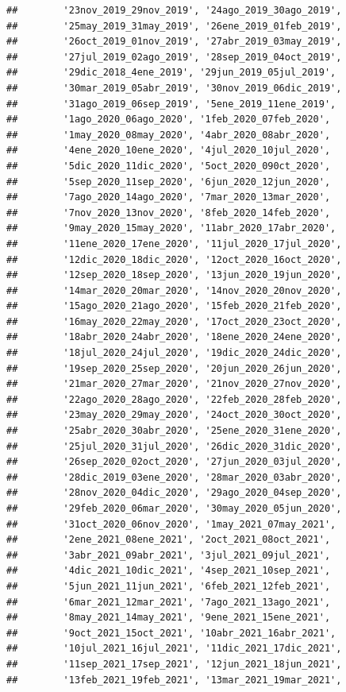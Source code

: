 \documentclass[
]{book}
\begin{document}
\begin{verbatim}
##        '23nov_2019_29nov_2019', '24ago_2019_30ago_2019',
##        '25may_2019_31may_2019', '26ene_2019_01feb_2019',
##        '26oct_2019_01nov_2019', '27abr_2019_03may_2019',
##        '27jul_2019_02ago_2019', '28sep_2019_04oct_2019',
##        '29dic_2018_4ene_2019', '29jun_2019_05jul_2019',
##        '30mar_2019_05abr_2019', '30nov_2019_06dic_2019',
##        '31ago_2019_06sep_2019', '5ene_2019_11ene_2019',
##        '1ago_2020_06ago_2020', '1feb_2020_07feb_2020',
##        '1may_2020_08may_2020', '4abr_2020_08abr_2020',
##        '4ene_2020_10ene_2020', '4jul_2020_10jul_2020',
##        '5dic_2020_11dic_2020', '5oct_2020_090ct_2020',
##        '5sep_2020_11sep_2020', '6jun_2020_12jun_2020',
##        '7ago_2020_14ago_2020', '7mar_2020_13mar_2020',
##        '7nov_2020_13nov_2020', '8feb_2020_14feb_2020',
##        '9may_2020_15may_2020', '11abr_2020_17abr_2020',
##        '11ene_2020_17ene_2020', '11jul_2020_17jul_2020',
##        '12dic_2020_18dic_2020', '12oct_2020_16oct_2020',
##        '12sep_2020_18sep_2020', '13jun_2020_19jun_2020',
##        '14mar_2020_20mar_2020', '14nov_2020_20nov_2020',
##        '15ago_2020_21ago_2020', '15feb_2020_21feb_2020',
##        '16may_2020_22may_2020', '17oct_2020_23oct_2020',
##        '18abr_2020_24abr_2020', '18ene_2020_24ene_2020',
##        '18jul_2020_24jul_2020', '19dic_2020_24dic_2020',
##        '19sep_2020_25sep_2020', '20jun_2020_26jun_2020',
##        '21mar_2020_27mar_2020', '21nov_2020_27nov_2020',
##        '22ago_2020_28ago_2020', '22feb_2020_28feb_2020',
##        '23may_2020_29may_2020', '24oct_2020_30oct_2020',
##        '25abr_2020_30abr_2020', '25ene_2020_31ene_2020',
##        '25jul_2020_31jul_2020', '26dic_2020_31dic_2020',
##        '26sep_2020_02oct_2020', '27jun_2020_03jul_2020',
##        '28dic_2019_03ene_2020', '28mar_2020_03abr_2020',
##        '28nov_2020_04dic_2020', '29ago_2020_04sep_2020',
##        '29feb_2020_06mar_2020', '30may_2020_05jun_2020',
##        '31oct_2020_06nov_2020', '1may_2021_07may_2021',
##        '2ene_2021_08ene_2021', '2oct_2021_08oct_2021',
##        '3abr_2021_09abr_2021', '3jul_2021_09jul_2021',
##        '4dic_2021_10dic_2021', '4sep_2021_10sep_2021',
##        '5jun_2021_11jun_2021', '6feb_2021_12feb_2021',
##        '6mar_2021_12mar_2021', '7ago_2021_13ago_2021',
##        '8may_2021_14may_2021', '9ene_2021_15ene_2021',
##        '9oct_2021_15oct_2021', '10abr_2021_16abr_2021',
##        '10jul_2021_16jul_2021', '11dic_2021_17dic_2021',
##        '11sep_2021_17sep_2021', '12jun_2021_18jun_2021',
##        '13feb_2021_19feb_2021', '13mar_2021_19mar_2021',

\end{verbatim}
\end{document}
